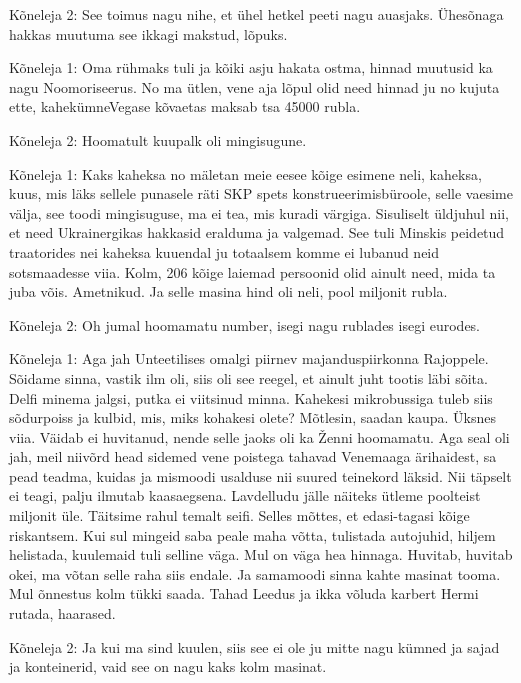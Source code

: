 Kõneleja 2:
See toimus nagu nihe, et ühel hetkel peeti nagu auasjaks. Ühesõnaga hakkas muutuma see ikkagi makstud, lõpuks.
                 
Kõneleja 1:
Oma rühmaks tuli ja kõiki asju hakata ostma, hinnad muutusid ka nagu Noomoriseerus. No ma ütlen, vene aja lõpul olid need hinnad ju no kujuta ette, kahekümneVegase kõvaetas maksab tsa 45000 rubla.
                 
Kõneleja 2:
Hoomatult kuupalk oli mingisugune.
                 
Kõneleja 1:
Kaks kaheksa no mäletan meie eesee kõige esimene neli, kaheksa, kuus, mis läks sellele punasele räti SKP spets konstrueerimisbüroole, selle vaesime välja, see toodi mingisuguse, ma ei tea, mis kuradi värgiga. Sisuliselt üldjuhul nii, et need Ukrainergikas hakkasid eralduma ja valgemad. See tuli Minskis peidetud traatorides nei kaheksa kuuendal ju totaalsem komme ei lubanud neid sotsmaadesse viia. Kolm, 206 kõige laiemad persoonid olid ainult need, mida ta juba võis. Ametnikud. Ja selle masina hind oli neli, pool miljonit rubla.
                 
Kõneleja 2:
Oh jumal hoomamatu number, isegi nagu rublades isegi eurodes.
                 
Kõneleja 1:
Aga jah Unteetilises omalgi piirnev majanduspiirkonna Rajoppele. Sõidame sinna, vastik ilm oli, siis oli see reegel, et ainult juht tootis läbi sõita. Delfi minema jalgsi, putka ei viitsinud minna. Kahekesi mikrobussiga tuleb siis sõdurpoiss ja kulbid, mis, miks kohakesi olete? Mõtlesin, saadan kaupa. Üksnes viia.
Väidab ei huvitanud, nende selle jaoks oli ka Ženni hoomamatu. Aga seal oli jah, meil niivõrd head sidemed vene poistega tahavad Venemaaga ärihaidest, sa pead teadma, kuidas ja mismoodi usalduse nii suured teinekord läksid. Nii täpselt ei teagi, palju ilmutab kaasaegsena. Lavdelludu jälle näiteks ütleme poolteist miljonit üle. Täitsime rahul temalt seifi. Selles mõttes, et edasi-tagasi kõige riskantsem. Kui sul mingeid saba peale maha võtta, tulistada autojuhid, hiljem helistada, kuulemaid tuli selline väga. Mul on väga hea hinnaga. Huvitab, huvitab okei, ma võtan selle raha siis endale. Ja samamoodi sinna kahte masinat tooma. Mul õnnestus kolm tükki saada. Tahad Leedus ja ikka võluda karbert Hermi rutada, haarased.
                 
Kõneleja 2:
Ja kui ma sind kuulen, siis see ei ole ju mitte nagu kümned ja sajad ja konteinerid, vaid see on nagu kaks kolm masinat.
                 
